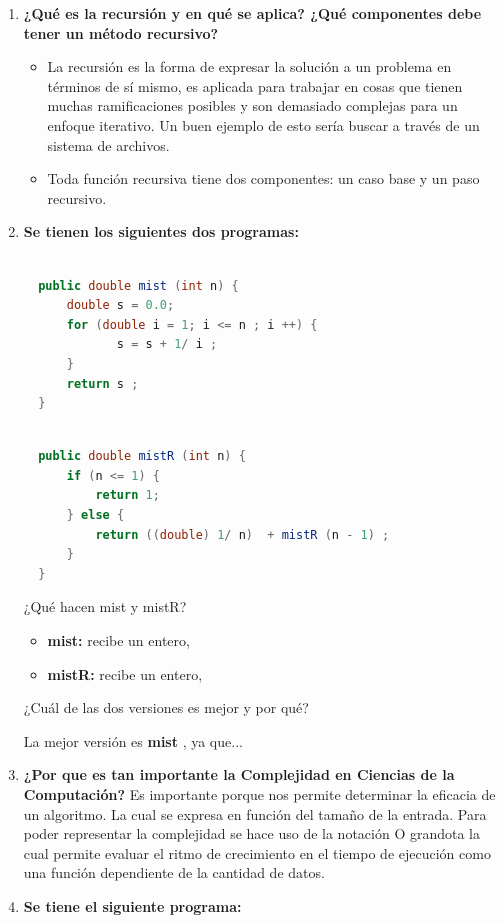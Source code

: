 \documentclass{report}
\begin{document}
\begin{enumerate}
    \item \textbf{¿Qué es la recursión y en qué se aplica? ¿Qué componentes debe tener un método recursivo?}
		    \begin{itemize}	
             \item La recursión es la forma de expresar la solución a un problema en términos de sí mismo, es aplicada para trabajar en cosas que tienen muchas ramificaciones posibles y son demasiado complejas para un enfoque iterativo. Un buen ejemplo de esto sería buscar a través de un sistema de archivos. 
             \item Toda función recursiva tiene dos componentes: un caso base y un paso recursivo. 
	        \end{itemize}
    \item \textbf{Se tienen los siguientes dos programas:}
			\newline
            \begin{lstlisting}[language=Java, caption=mist]

  public double mist (int n) {
      double s = 0.0;
      for (double i = 1; i <= n ; i ++) {
             s = s + 1/ i ;
      }
      return s ;
  }	
            \end{lstlisting}

            \begin{lstlisting}[language=Java, caption=mistR]

  public double mistR (int n) {
      if (n <= 1) {
          return 1;
      } else {
          return ((double) 1/ n)  + mistR (n - 1) ;
      } 
  }
            \end{lstlisting}

            \newline ¿Qué hacen mist y mistR?
            \begin{itemize}
                \item \textbf{mist: } recibe un entero, 
                \item \textbf{mistR: } recibe un entero, 
            \end{itemize}
            \newline ¿Cuál de las dos versiones es mejor y por qué?
               
            \newline La mejor versión es \textbf{mist }, ya que... 
    \item \textbf{¿Por que es tan importante la Complejidad en Ciencias de la Computación?}
			    \newline Es importante porque nos permite determinar la eficacia de un algoritmo. La cual se expresa en función del tamaño de la entrada.
                Para poder representar la complejidad se hace uso de la notación O grandota la cual permite evaluar el ritmo de crecimiento
                en el tiempo de ejecución como una función dependiente de la cantidad de datos.
	\item \textbf{Se tiene el siguiente programa:}	
            \begin{lstlisting}[language=Java, caption=mist]
            

\end{lstlisting}
\end{enumerate}
\end{document}
